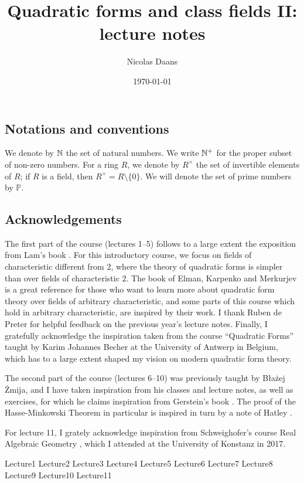 \documentclass[12pt, leqno, british]{amsart}
\title{Quadratic forms and class fields II: lecture notes}
\author{Nicolas Daans}
\date{\today}
\begin{document}
\maketitle
\tableofcontents

\subsection*{Notations and conventions}
We denote by $\mathbb N$ the set of natural numbers.
We write $\mathbb N^+$ for the proper subset of non-zero numbers.
For a ring $R$, we denote by $R^\times$ the set of invertible elements of $R$; if $R$ is a field, then $R^\times = R \setminus \lbrace 0 \rbrace$.
We will denote the set of prime numbers by $\mathbb{P}$.

\subsection*{Acknowledgements}
The first part of the course (lectures 1--5) follows to a large extent the exposition from Lam's book \autocite{Lam}.
For this introductory course, we focus on fields of characteristic different from $2$, where the theory of quadratic forms is simpler than over fields of characteristic $2$.
The book of Elman, Karpenko and Merkurjev \autocite{ElmanKarpenkoMerkurjev} is a great reference for those who want to learn more about quadratic form theory over fields of arbitrary characteristic, and some parts of this course which hold in arbitrary characteristic, are inspired by their work.
I thank Ruben de Preter for helpful feedback on the previous year's lecture notes.
Finally, I gratefully acknowledge the inspiration taken from the course ``Quadratic Forms'' taught by Karim Johannes Becher at the University of Antwerp in Belgium, which has to a large extent shaped my vision on modern quadratic form theory.

The second part of the course (lectures 6--10) was previously taught by B{\l}a{\.z}ej {\.Z}mija, and I have taken inspiration from his classes and lecture notes, as well as exercises, for which he claims inspiration from Gerstein's book \cite{Gerstein}.
The proof of the Hasse-Minkowski Theorem in particular is inspired in turn by a note of Hatley \cite{Hat}.

For lecture 11, I grately acknowledge inspiration from Schweighofer's course Real Algebraic Geometry \cite[Section 1.6]{RAG}, which I attended at the University of Konstanz in 2017.

{Lecture1}
{Lecture2}
{Lecture3}
{Lecture4}
{Lecture5}
{Lecture6}
{Lecture7}
{Lecture8}
{Lecture9}
{Lecture10}
{Lecture11}

\printindex
\printbibliography
\end{document}
